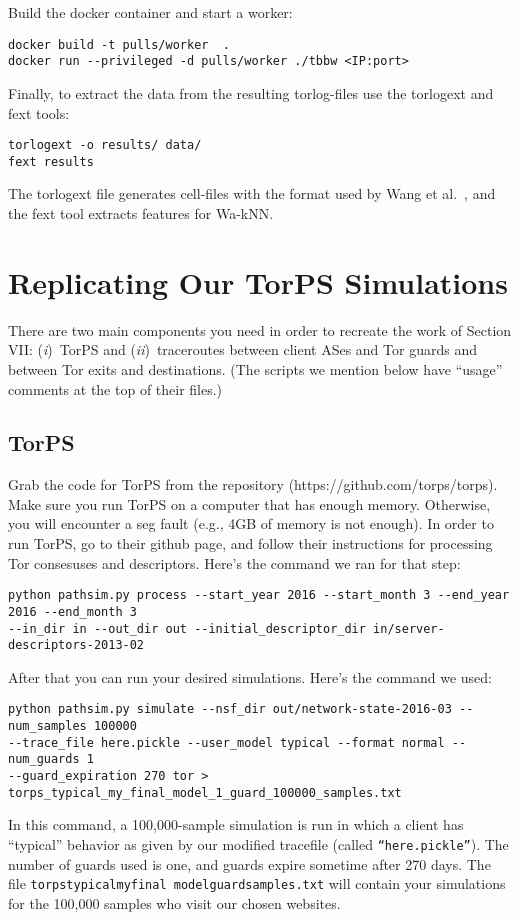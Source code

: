 \documentclass{article}
\newcommand{\first}{(\emph{i})\xspace}
\newcommand{\second}{(\emph{ii})\xspace}
\begin{document}
Build the docker container and start a worker:

\begin{lstlisting}
docker build -t pulls/worker  .
docker run --privileged -d pulls/worker ./tbbw <IP:port>
\end{lstlisting}

Finally, to extract the data from the resulting torlog-files use the
torlogext and fext tools:

\begin{lstlisting}
torlogext -o results/ data/
fext results
\end{lstlisting}
The torlogext file generates cell-files with the format used by
Wang et al.~\cite{Wang2014a}, and the fext tool extracts features for Wa-kNN.


%
%
%
%
%
%
\section{Replicating Our TorPS Simulations}
There are two main components you need in order to recreate the work of Section VII: 
\first~TorPS and \second~traceroutes between client ASes and Tor guards and between Tor 
exits and destinations. (The scripts we mention below have ``usage'' comments at the 
top of their files.)

\subsection{TorPS}
Grab the code for TorPS from the repository (https://github.com/torps/torps). 
Make sure you run TorPS on a computer 
that has enough memory. Otherwise, you will encounter a seg fault (e.g., 4GB of 
memory is not enough). In order to run TorPS, go to their github page, and follow 
their instructions for processing Tor consesuses and descriptors. Here's the command 
we ran for that step:
\begin{lstlisting}
python pathsim.py process --start_year 2016 --start_month 3 --end_year 2016 --end_month 3
--in_dir in --out_dir out --initial_descriptor_dir in/server-descriptors-2013-02
\end{lstlisting}

After that you can run your desired simulations. Here's the command we used:
\begin{lstlisting}
python pathsim.py simulate --nsf_dir out/network-state-2016-03 --num_samples 100000 
--trace_file here.pickle --user_model typical --format normal --num_guards 1 
--guard_expiration 270 tor > torps_typical_my_final_model_1_guard_100000_samples.txt
\end{lstlisting}
In this command, a 100,000-sample simulation is run in which a client has ``typical'' 
behavior as given by our modified trace\textunderscore file (called {\tt ``here.pickle''}). 
The number of 
guards used is one, and guards expire sometime after 270 days. The file 
{\tt torps\textunderscore typical\textunderscore my\textunderscore final
\textunderscore model\textunderscore guard\textunderscore samples.txt} will contain your 
simulations for the 100,000 samples who visit our chosen websites. 
\end{document}
